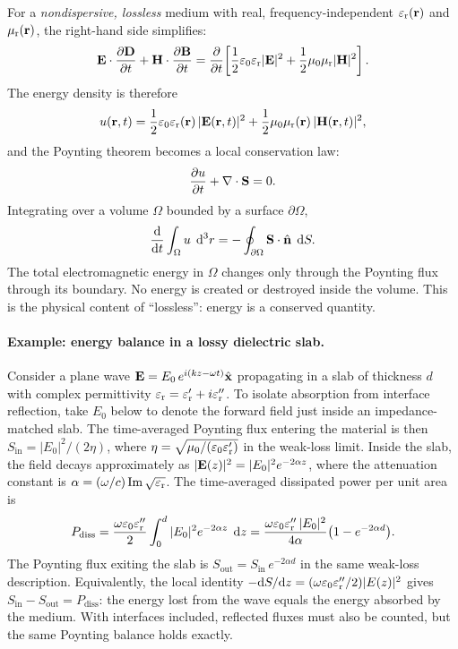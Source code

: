 For a \emph{nondispersive, lossless} medium with real, frequency-independent
$\varepsilon_{\mathrm{r}}(\mathbf{r})$ and $\mu_{\mathrm{r}}(\mathbf{r})$, the right-hand side simplifies:
\begin{equation}
 \mathbf{E}\cdot\frac{\partial \mathbf{D}}{\partial t} + \mathbf{H}\cdot\frac{\partial \mathbf{B}}{\partial t}
 = \frac{\partial }{\partial t}\!\left[
 \frac{1}{2}\varepsilon_0\varepsilon_{\mathrm{r}}|\mathbf{E}|^2
 + \frac{1}{2}\mu_0\mu_{\mathrm{r}}|\mathbf{H}|^2
 \right].
 \label{eq:u-nondispersive}
\end{equation}
The energy density is therefore
\begin{equation}
 u(\mathbf{r},t) = \frac{1}{2}\varepsilon_0\varepsilon_{\mathrm{r}}(\mathbf{r})\,|\mathbf{E}(\mathbf{r},t)|^2
 + \frac{1}{2}\mu_0\mu_{\mathrm{r}}(\mathbf{r})\,|\mathbf{H}(\mathbf{r},t)|^2,
 \label{eq:energy-density}
\end{equation}
and the Poynting theorem becomes a local conservation law:
\begin{equation}
 \frac{\partial u}{\partial t} + \nabla\cdot\mathbf{S} = 0.
 \label{eq:energy-conservation}
\end{equation}
Integrating over a volume $\Omega$ bounded by a surface $\partial\Omega$,
\begin{equation}
 \frac{\mathop{}\!\mathrm{d} }{\mathop{}\!\mathrm{d} t}\int_\Omega u\;\mathop{}\!\mathrm{d}^3 r
 = -\oint_{\partial\Omega}\mathbf{S}\cdot\hat{\mathbf{n}}\;\mathop{}\!\mathrm{d} S.
 \label{eq:energy-integral}
\end{equation}
The total electromagnetic energy in $\Omega$ changes only through the Poynting
flux through its boundary. No energy is created or destroyed inside the
volume. This is the physical content of ``lossless'': energy is a
conserved quantity.

\paragraph{Example: energy balance in a lossy dielectric slab.}
Consider a plane wave $\mathbf{E} = E_0\,e^{i(kz-\omega t)}\hat{\mathbf{x}}$
propagating in a slab of thickness $d$ with complex permittivity
$\varepsilon_{\mathrm{r}} = \varepsilon_{\mathrm{r}}' + i\varepsilon_{\mathrm{r}}''$. To isolate absorption from interface
reflection, take $E_0$ below to denote the forward field just inside an
impedance-matched slab. The time-averaged Poynting flux entering the
material is then $S_{\mathrm{in}} = |E_0|^2/(2\eta)$, where
$\eta = \sqrt{\mu_0/(\varepsilon_0\varepsilon_{\mathrm{r}}')}$ in the weak-loss limit.
Inside the slab, the field decays approximately as
$|\mathbf{E}(z)|^2 = |E_0|^2 e^{-2\alpha z}$, where the attenuation constant
is $\alpha = (\omega/c)\operatorname{Im}\sqrt{\varepsilon_{\mathrm{r}}}$. The time-averaged dissipated
power per unit area is
\begin{equation}
 P_{\mathrm{diss}} = \frac{\omega\varepsilon_0\varepsilon_{\mathrm{r}}''}{2}
 \int_0^d |E_0|^2 e^{-2\alpha z}\;\mathop{}\!\mathrm{d} z
 = \frac{\omega\varepsilon_0\varepsilon_{\mathrm{r}}''\,|E_0|^2}{4\alpha}
 \bigl(1 - e^{-2\alpha d}\bigr).
 \label{eq:slab-dissipation}
\end{equation}
The Poynting flux exiting the slab is
$S_{\mathrm{out}} = S_{\mathrm{in}}\,e^{-2\alpha d}$ in the same weak-loss
description. Equivalently, the local identity
$-\mathrm{d}S/\mathrm{d}z =
(\omega\varepsilon_0\varepsilon_{\mathrm{r}}''/2)|E(z)|^2$ gives
$S_{\mathrm{in}} - S_{\mathrm{out}} = P_{\mathrm{diss}}$: the energy
lost from the wave equals the energy absorbed by the medium. With
interfaces included, reflected fluxes must also be counted, but the same
Poynting balance holds exactly.

